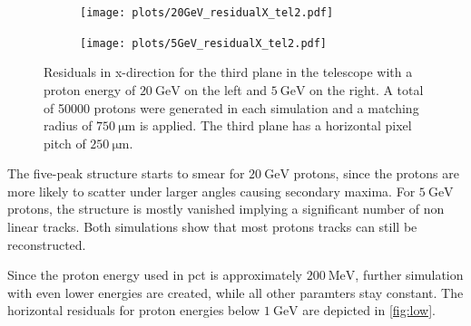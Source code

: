 \begin{figure}
  \hspace{-2.5cm}
  \begin{subfigure}{0.62\textwidth}
      \centering
      \texttt{[image: plots/20GeV\_residualX\_tel2.pdf]}
  \end{subfigure}
  \begin{subfigure}{0.62\textwidth}
      \hspace{0.95cm}
      \texttt{[image: plots/5GeV\_residualX\_tel2.pdf]}
  \end{subfigure}
  \caption{Residuals in x-direction for the third plane in the telescope with a proton energy of $\SI{20}{\giga\eV}$ on the left
  and $\SI{5}{\GeV}$ on the right. A total of 50000 protons were generated in each simulation and a matching radius of $\SI{750}{\micro\meter}$ is applied. The third plane has
  a horizontal pixel pitch of $\SI{250}{\micro\meter}$.}
  \label{fig:20GeV}
\end{figure}

The five-peak structure starts to smear for $\SI{20}{\giga\eV}$ protons, since the protons are more likely to scatter under larger angles causing secondary maxima.
For $\SI{5}{\GeV}$ protons, the structure is mostly vanished implying a significant number of non linear tracks. Both simulations show that most
protons tracks can still be reconstructed.

Since the proton energy used in pct is approximately $\SI{200}{\mega\eV}$, further simulation with even lower energies are created, while all other paramters stay constant.
The horizontal residuals for proton energies below $\SI{1}{\giga\eV}$ are depicted in \ref{fig:low}.

